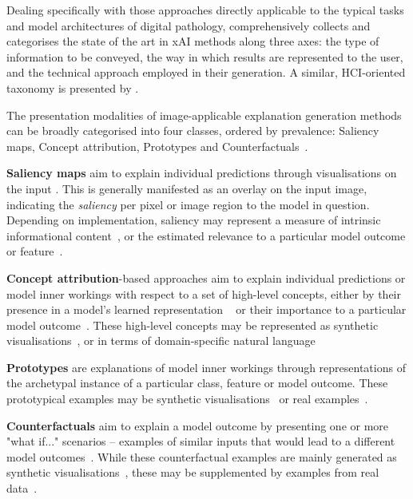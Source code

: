 Dealing specifically with those approaches directly applicable to the typical tasks and model architectures of digital pathology, \citet{poceviciute_survey_2020} comprehensively collects and categorises the state of the art in xAI methods along three axes: the type of information to be conveyed, the way in which results are represented to the user, and the technical approach employed in their generation. A similar, HCI-oriented taxonomy is presented by \citet{liao2020questioning}. 

The presentation modalities of image-applicable explanation generation methods can be broadly categorised into four classes, ordered by prevalence: Saliency maps, Concept attribution, Prototypes and Counterfactuals~\cite{bodria_benchmarking_2021}.

\textbf{Saliency maps} aim to explain individual predictions through visualisations on the input \cite{MorchEtAl:1995:Saliency}. This is generally manifested as an overlay on the input image, indicating the \textit{saliency} per pixel or image region to the model in question. Depending on implementation, saliency may represent a measure of intrinsic informational content~\cite{KadirBrady:2001:Saliency}, or the estimated relevance to a particular model outcome or feature~\cite{SimonyanVedaldiZisserman:2013:DeepInside, springenberg2014striving, yosinski2015deepvisualization, LapuschkinEtAl:2016:LRP, selvaraju2017grad, ribeiro2018anchors}.

\textbf{Concept attribution}-based approaches aim to explain individual predictions or model inner workings with respect to a set of high-level concepts, either by their presence in a model's learned representation ~\cite{GrazianiHenning:2020:ConceptAttribution} or their importance to a particular model outcome~\cite{kim2018interpretability}. These high-level concepts may be represented as synthetic visualisations~\cite{erhan2009visualizing, yosinski2015deepvisualization}, or in terms of domain-specific natural language~\cite{GrazianiHenning:2020:ConceptAttribution, kim2018interpretability} 

\textbf{Prototypes} are explanations of model inner workings through representations of the archetypal instance of a particular class, feature or model outcome. These prototypical examples may be synthetic visualisations~\cite{li2018deep} or real examples~\cite{kim2016examples}.

\textbf{Counterfactuals} aim to explain a model outcome by presenting one or more "what if..." scenarios -- examples of similar inputs that would lead to a different model outcomes~\cite{ginsberg1986counterfactuals}. While these counterfactual examples are mainly generated as synthetic visualisations~\cite{seah2019chest, poceviciute_survey_2020, liu2019generative}, these may be supplemented by examples from real data~\cite{gulshad2021counterfactual}.

